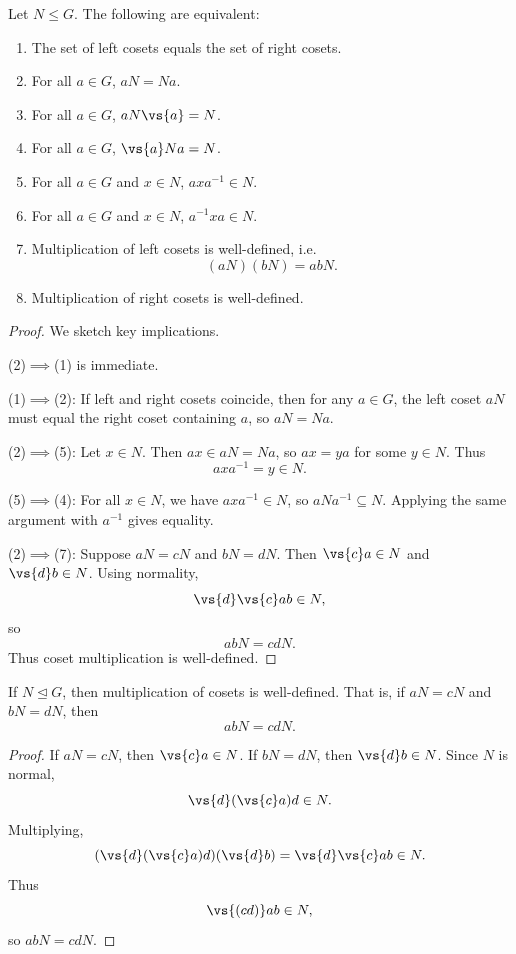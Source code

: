 \begin{theorem*}{
    Let $N\leq G$.
    The following are equivalent:
    \begin{enumerate}
        \item The set of left cosets equals the set of right cosets.
        \item For all $a\in G$, $aN=Na$.
        \item For all $a\in G$, $aN\vs{a}=N$.
        \item For all $a\in G$, $\vs{a}Na=N$.
        \item For all $a\in G$ and $x\in N$, $axa^{-1}\in N$.
        \item For all $a\in G$ and $x\in N$, $a^{-1}xa\in N$.
        \item Multiplication of left cosets is well-defined, i.e.
        \[
            (aN)(bN)=abN.
        \]
        \item Multiplication of right cosets is well-defined.
    \end{enumerate}
}
\end{theorem*}

\begin{proof}
    We sketch key implications.

    (2)$\implies$(1) is immediate.

    (1)$\implies$(2):
    If left and right cosets coincide, then for any $a\in G$, the left coset $aN$ must equal the right coset containing $a$, so $aN=Na$.

    (2)$\implies$(5):
    Let $x\in N$.
    Then $ax\in aN=Na$, so $ax=ya$ for some $y\in N$.
    Thus
    \[
        axa^{-1}=y\in N.
    \]

    (5)$\implies$(4):
    For all $x\in N$, we have $axa^{-1}\in N$, so $aNa^{-1}\subseteq N$.
    Applying the same argument with $a^{-1}$ gives equality.

    (2)$\implies$(7):
    Suppose $aN=cN$ and $bN=dN$.
    Then $\vs{c}a\in N$ and $\vs{d}b\in N$.
    Using normality,
    \[
        \vs{d}\vs{c}ab\in N,
    \]
    so
    \[
        abN=cdN.
    \]
    Thus coset multiplication is well-defined.
\end{proof}

\begin{theorem*}{
    If $N\trianglelefteq G$, then multiplication of cosets is well-defined.
    That is, if $aN=cN$ and $bN=dN$, then
    \[
        abN=cdN.
    \]
}
\end{theorem*}

\begin{proof}
    If $aN=cN$, then $\vs{c}a\in N$.
    If $bN=dN$, then $\vs{d}b\in N$.
    Since $N$ is normal,
    \[
        \vs{d}(\vs{c}a)d\in N.
    \]
    Multiplying,
    \[
        (\vs{d}(\vs{c}a)d)(\vs{d}b)=\vs{d}\vs{c}ab\in N.
    \]
    Thus
    \[
        \vs{(cd)}ab\in N,
    \]
    so $abN=cdN$.
\end{proof}

